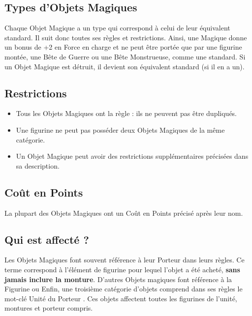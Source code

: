 \subsection{Types d'Objets Magiques}

Chaque Objet Magique a un type qui correspond à celui de leur équivalent standard. Il suit donc toutes ses règles et restrictions. Ainsi, une \lance{} Magique donne un bonus de +2 en Force en charge et ne peut être portée que par une figurine montée, une Bête de Guerre ou une Bête Monstrueuse, comme une \lance{} standard. Si un Objet Magique est détruit, il devient son équivalent standard (si il en a un).

\subsection{Restrictions}

\begin{itemize}[label={\textbullet}]
\item Tous les Objets Magiques ont la règle \oneperarmy{} : ils ne peuvent pas être dupliqués.
\item Une figurine ne peut pas posséder deux Objets Magiques de la même catégorie.
\item Un Objet Magique peut avoir des restrictions supplémentaires précisées dans sa description.
\end{itemize}

\subsection{Coût en Points}

La plupart des Objets Magiques ont un Coût en Points précisé après leur nom. 

\subsection{Qui est affecté ?}

Les Objets Magiques font souvent référence à leur \og Porteur \fg{} dans leurs règles. Ce terme correspond à l'élément de figurine pour lequel l'objet a été acheté, \textbf{sans jamais inclure la monture}. D'autres Objets magiques font référence à la \og Figurine \fg{} ou  Enfin, une troisième catégorie d'objets comprend dans ses règles le mot-clé \og Unité du Porteur \fg{}. Ces objets affectent toutes les figurines de l'unité, montures et porteur compris.

